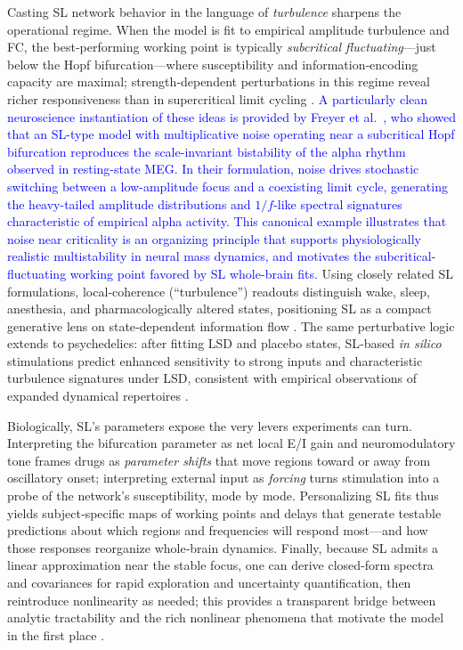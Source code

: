 \documentclass[12pt]{article}
\numberwithin{equation}{section}
\newcommand{\rev}[1]{\textcolor{blue}{#1}}
\begin{document}
Casting SL network behavior in the language of \emph{turbulence} sharpens the operational regime. When the model is fit to empirical amplitude turbulence and FC, the best‑performing working point is typically \emph{subcritical fluctuating}—just below the Hopf bifurcation—where susceptibility and information‑encoding capacity are maximal; strength‑dependent perturbations in this regime reveal richer responsiveness than in supercritical limit cycling \cite{decoTurbulentlikeDynamicsHuman2020, SanzPerl2022StrengthDependent}. 
\rev{A particularly clean neuroscience instantiation of these ideas is provided by Freyer et al.~\cite{freyer_2012}, who showed that an SL-type model with multiplicative noise operating near a subcritical Hopf bifurcation reproduces the scale-invariant bistability of the alpha rhythm observed in resting-state MEG. In their formulation, noise drives stochastic switching between a low-amplitude focus and a coexisting limit cycle, generating the heavy-tailed amplitude distributions and $1/f$-like spectral signatures characteristic of empirical alpha activity. This canonical example illustrates that noise near criticality is an organizing principle that supports physiologically realistic multistability in neural mass dynamics, and motivates the subcritical-fluctuating working point favored by SL whole-brain fits.}
Using closely related SL formulations, local‑coherence (“turbulence”) readouts distinguish wake, sleep, anesthesia, and pharmacologically altered states, positioning SL as a compact generative lens on state‑dependent information flow \cite{Escrichs2022Turbulence}. The same perturbative logic extends to psychedelics: after fitting LSD and placebo states, SL‑based \emph{in silico} stimulations predict enhanced sensitivity to strong inputs and characteristic turbulence signatures under LSD, consistent with empirical observations of expanded dynamical repertoires \cite{Jobst2021LSD,cruzatEffectsClassicPsychedelic2022}.

Biologically, SL’s parameters expose the very levers experiments can turn. Interpreting the bifurcation parameter as net local E/I gain and neuromodulatory tone frames drugs as \emph{parameter shifts} that move regions toward or away from oscillatory onset; interpreting external input as \emph{forcing} turns stimulation into a probe of the network’s susceptibility, mode by mode. Personalizing SL fits thus yields subject‑specific maps of working points and delays that generate testable predictions about which regions and frequencies will respond most—and how those responses reorganize whole‑brain dynamics. Finally, because SL admits a linear approximation near the stable focus, one can derive closed‑form spectra and covariances for rapid exploration and uncertainty quantification, then reintroduce nonlinearity as needed; this provides a transparent bridge between analytic tractability and the rich nonlinear phenomena that motivate the model in the first place \cite{PonceAlvarez2024HopfLinear}.
\end{document}
